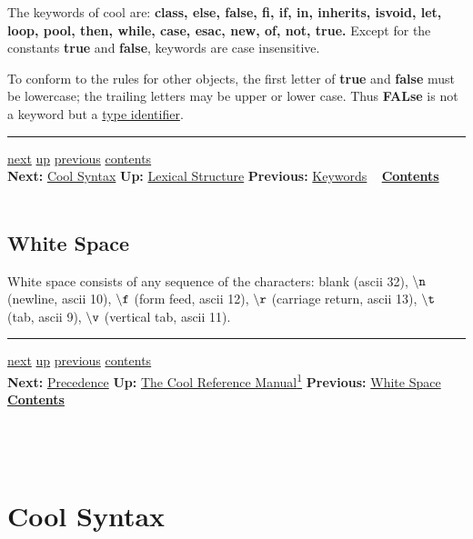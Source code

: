\documentclass[]{article}
\begin{document}
The keywords of cool are: \textbf{class, else, false, fi, if, in,
inherits, isvoid, let, loop, pool, then, while, case, esac, new, of,
not, true.} Except for the constants \textbf{true} and \textbf{false},
keywords are case insensitive.

To conform to the rules for other objects, the first letter of
\textbf{true} and \textbf{false} must be lowercase; the trailing letters
may be upper or lower case. Thus \textbf{FALse} is not a keyword but a
\href{node34.html}{type identifier}.

\begin{center}\rule{3in}{0.4pt}\end{center}

\href{node39.html}{next} \href{node33.html}{up}
\href{node37.html}{previous} \href{node1.html}{contents} \\
\textbf{Next:} \href{node39.html}{Cool Syntax} \textbf{Up:}
\href{node33.html}{Lexical Structure} \textbf{Previous:}
\href{node37.html}{Keywords} ~ \textbf{\href{node1.html}{Contents}} \\
\\

\subsection{White Space}

White space consists of any sequence of the characters: blank (ascii
32), $\tt\backslash n$ (newline, ascii 10), $\tt\backslash f$ (form
feed, ascii 12), $\tt\backslash r$ (carriage return, ascii 13),
$\tt\backslash t$ (tab, ascii 9), $\tt\backslash v$ (vertical tab, ascii
11). \\

\begin{center}\rule{3in}{0.4pt}\end{center}

\href{node40.html}{next} \href{cool-manual.html}{up}
\href{node38.html}{previous} \href{node1.html}{contents} \\
\textbf{Next:} \href{node40.html}{Precedence} \textbf{Up:}
\href{cool-manual.html}{The Cool Reference Manual\textsuperscript{1}}
\textbf{Previous:} \href{node38.html}{White Space} ~
\textbf{\href{node1.html}{Contents}} \\ \\

\section{\\ Cool Syntax}
\end{document}

